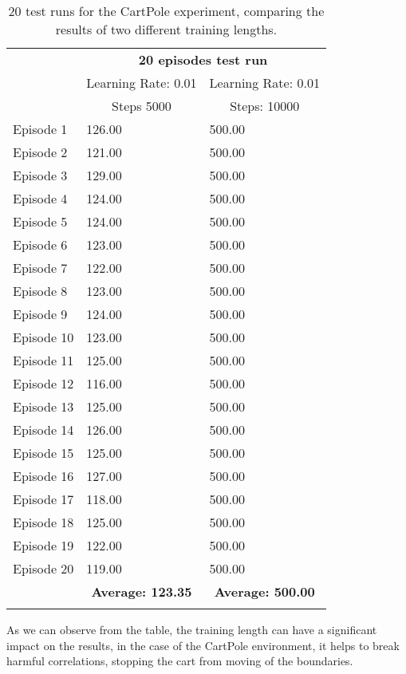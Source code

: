\begin{table}[H]
 \caption{20 test runs for the CartPole experiment, comparing the results of two different training lengths.}

 \begin{tabular}{ |p{2.2cm}|p{3cm}|p{3cm}| }
 \cline{2-3} 
 \multicolumn{1}{c}{} & \multicolumn{2}{|c|}{ \textbf{20 episodes test run}} \\
 \cline{2-3} 
 \multicolumn{1}{c}{} & \multicolumn{1}{|c|}{Learning Rate: 0.01} & \multicolumn{1}{|c|}{Learning Rate: 0.01}\\
 \multicolumn{1}{c}{} & \multicolumn{1}{|c|}{Steps 5000} & \multicolumn{1}{|c|}{Steps: 10000}\\
 \hline
 Episode 1 & 126.00 & 500.00\\
 Episode 2 & 121.00 & 500.00\\
 Episode 3 & 129.00 & 500.00\\
 Episode 4 & 124.00 & 500.00\\
 Episode 5 & 124.00 & 500.00\\
 Episode 6 & 123.00 & 500.00\\
 Episode 7 & 122.00 & 500.00\\
 Episode 8 & 123.00 & 500.00\\
 Episode 9 & 124.00 & 500.00\\
 Episode 10 & 123.00 &500.00 \\
 Episode 11 & 125.00 &500.00 \\
 Episode 12 & 116.00 &500.00 \\
 Episode 13 & 125.00 &500.00 \\
 Episode 14 & 126.00 &500.00 \\
 Episode 15 & 125.00 &500.00 \\
 Episode 16 & 127.00 &500.00 \\
 Episode 17 & 118.00 &500.00 \\
 Episode 18 & 125.00 &500.00 \\
 Episode 19 & 122.00 &500.00 \\
 Episode 20 & 119.00 &500.00 \\
 \hline
 \multicolumn{1}{c}{} & \multicolumn{1}{|c|}{\textbf{Average: 123.35}} & \multicolumn{1}{|c|}{\textbf{Average: 500.00}} \\
 \cline{2-3}
 \multicolumn{3}{c}{} 
 \end{tabular}
\end{table}
 
 As we can observe from the table, the training length can have a significant impact on the results, 
 in the case of the CartPole environment, it helps to break harmful correlations, stopping the cart from moving of the boundaries. 

